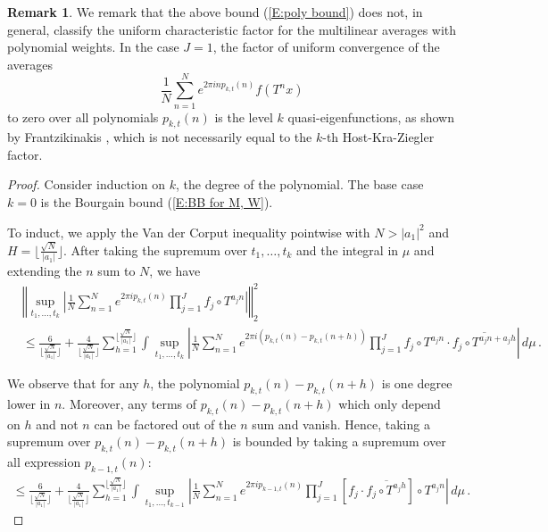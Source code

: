 \documentclass[11pt, oneside]{amsart}   	%
\newcommand{\1}{\mathbbm{1}}
\newcommand{\floor}[1]{\lfloor#1\rfloor}
\theoremstyle{definition}
\newtheorem{remark}[theorem]{Remark}
\begin{document}
\begin{remark}
We remark that the above bound (\ref{E:poly bound}) does not, in general, classify the uniform characteristic factor for the multilinear averages with polynomial weights. In the case $J=1$, the factor of uniform convergence of the averages
$$\frac{1}{N}\sum_{n=1}^N e^{2\pi i n p_{k, t}(n)}f(T^nx)$$
to zero over all polynomials $p_{k, t}(n)$ is the level $k$ quasi-eigenfunctions, as shown by Frantzikinakis \cite{FRANTZIKINAKIS_2006}, which is not necessarily equal to the $k$-th Host-Kra-Ziegler factor. 
\end{remark}



\begin{proof}
Consider induction on $k$, the degree of the polynomial. The base case $k=0$ is the Bourgain bound (\ref{E:BB for M, W}).




To induct, we apply the Van der Corput inequality pointwise with $N > |a_1|^2$ and $H = \floor{\frac{\sqrt{N}}{|a_1|}}$.
After taking the supremum over $t_1, \dots, t_k$ and the integral in $\mu$ and extending the $n$ sum to $N$, we have
\begin{align*}
&\left\Vert \sup_{t_1, \dots, t_k} \left|\frac{1}{N}\sum_{n=1}^N e^{2\pi i p_{k, t}(n)} \prod_{j=1}^J f_j \circ T^{a_j n} \right| \right\Vert_2^2 \\
&\leq \frac{6}{\floor{\frac{\sqrt{N}}{|a_1|}}} + \frac{4}{\floor{\frac{\sqrt{N}}{|a_1|}}}\sum_{h=1}^{\floor{\frac{\sqrt{N}}{|a_1|}}} \int \sup_{t_1, \dots, t_k} \left| \frac{1}{N}\sum_{n=1}^{N} e^{2\pi i (p_{k, t}(n) - p_{k, t}(n+h))} \prod_{j=1}^J f_j\circ T^{a_jn} \cdot \overline{f_j \circ T^{a_jn + a_jh}}\right|\, d\mu  \, .%
\end{align*}

We observe that for any $h$, the polynomial $p_{k, t}(n) - p_{k, t}(n+h)$ is one degree lower in $n$. Moreover, any terms of $p_{k, t}(n) - p_{k, t}(n+h)$ which only depend on $h$ and not $n$ can be factored out of the $n$ sum and vanish. Hence, taking a supremum over $p_{k, t}(n) - p_{k, t}(n+h)$ is bounded by taking a supremum over all expression $p_{k-1, t}(n)$:
\begin{align*}
\leq \frac{6}{\floor{\frac{\sqrt{N}}{|a_1|}}} + \frac{4}{\floor{\frac{\sqrt{N}}{|a_1|}}}\sum_{h=1}^{\floor{\frac{\sqrt{N}}{|a_1|}}} \int \sup_{t_1, \dots, t_{k-1}} \left| \frac{1}{N}\sum_{n=1}^{N} e^{2\pi i p_{k-1, t}(n)} \prod_{j=1}^J [f_j \cdot \overline{f_j \circ T^{a_jh}}] \circ T^{a_jn} \right|\, d\mu \, .
\end{align*}


\end{proof}
\end{document}

